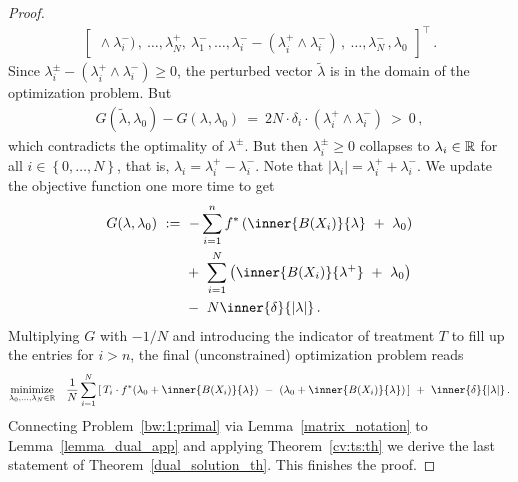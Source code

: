 \begin{proof}
\begin{gather}
\begin{bmatrix}
      \!
      \land
      \lambda_i^-
      )\,,
      \ 
      \ldots,
      \lambda_N^+,
      \ 
      \lambda_1^-,
      \ldots,
      \lambda_i^-
      \!
      -
      (
      \lambda_i^+
      \!
      \land
      \lambda_i^-
      )\,,
      \ 
      \ldots,
      \lambda_N^-
      \,,
      \lambda_0
    \end{bmatrix}
    ^\top
    \,.
  \end{gather}
  Since 
  $
      \lambda_i^\pm
      -
      (
      \lambda_i^+
      \!
      \land
      \lambda_i^-
      )
      \ge 
      0
  $,
  the perturbed vector $\tilde{\lambda}$ is in the domain of the 
  optimization problem.
  But 
  \begin{align}
  G(\tilde{\lambda},\lambda_0)
  -
  G(\lambda,\lambda_0)
  \ 
  =
  \ 
  2
  N
  \cdot
  \delta_i
  \cdot
      (
      \lambda_i^+
      \!
      \land
      \lambda_i^-
      )
  \ 
  >
  \ 
  0
  \,,
  \end{align}
  which contradicts the optimality of $\lambda^\pm$.
But then 
$
\lambda^\pm_i
\ge 0
$
collapses to
$
\lambda_i\in \mathbb{R}
$ 
for all
$i\in \left\{ 0,\ldots,N \right\}$, that is,
$ \lambda_i=\lambda_i^+\!-\lambda_i^- $.
Note that
$ |\lambda_i|=\lambda_i^+\!+\lambda_i^- $.
We update the objective function one more time to get
\begin{align*}
  G(\lambda,\lambda_0)
  &
  \ 
  :=
  \ 
    -
    \sum_{i=1}^{n} 
    f^*
    \left( 
      \inner{B(X_i)}{\lambda}
      \ 
      +
      \ 
      \lambda_0
    \right)
    \\
    &
    \qquad 
    +
    \ 
    \sum_{i=1}^{N} 
    \left( 
      \inner{B(X_i)}{\lambda^+}
      \ 
      +
      \ 
      \lambda_0
    \right)
    \\
    &
    \qquad 
    -
    \ 
    N
    \inner{\delta}{|\lambda|}
    \,.
\end{align*}
Multiplying $G$ with $-1/N$ and introducing the indicator of
treatment $T$ to fill up the entries for $i>n$, the final (unconstrained) optimization problem reads
\begin{gather*}
  \underset
  {\lambda_0,\ldots,\lambda_{N}\in \R}
  {
    \mathrm{minimize}
  }
  \quad
  \frac{1}{N}
\sum_{i=1} 
  ^N
  \left[ 
    \,
  T_i
  \cdot
  f^*
  \!
  \left( 
\lambda_0
+
\inner
{B(X_i)}
{\lambda}
  \right)
  \ 
-
\ 
  \left( 
\lambda_0
+
\inner
{B(X_i)}
{\lambda}
  \right)
  \,
  \right]
  \ 
+
\ 
\inner
{\delta}
{|\lambda|}
  \,.
\end{gather*}
Connecting Problem~\ref{bw:1:primal} via Lemma~\ref{matrix_notation} to Lemma~\ref{lemma_dual_app} and applying Theorem~\ref{cv:ts:th} we derive the last statement of Theorem~\ref{dual_solution_th}. This finishes the proof.
\end{proof}

